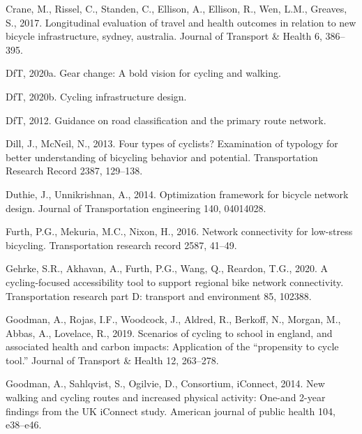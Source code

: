 \documentclass[
]{article}
\newlength{\cslhangindent}
\newlength{\cslentryspacingunit} %
\newenvironment{CSLReferences}[2] %
 {%
  \setlength{\parindent}{0pt}
  \ifodd #1
  \let\oldpar\par
  \def\par{\hangindent=\cslhangindent\oldpar}
  \fi
  \setlength{\parskip}{#2\cslentryspacingunit}
 }%
 {}
\begin{document}
\begin{CSLReferences}{1}{0}
\leavevmode{}%
Crane, M., Rissel, C., Standen, C., Ellison, A., Ellison, R., Wen, L.M., Greaves, S., 2017. Longitudinal evaluation of travel and health outcomes in relation to new bicycle infrastructure, sydney, australia. Journal of Transport \& Health 6, 386--395.

\leavevmode{}%
DfT, 2020a. Gear change: A bold vision for cycling and walking.

\leavevmode{}%
DfT, 2020b. Cycling infrastructure design.

\leavevmode{}%
DfT, 2012. Guidance on road classification and the primary route network.

\leavevmode{}%
Dill, J., McNeil, N., 2013. Four types of cyclists? Examination of typology for better understanding of bicycling behavior and potential. Transportation Research Record 2387, 129--138.

\leavevmode{}%
Duthie, J., Unnikrishnan, A., 2014. Optimization framework for bicycle network design. Journal of Transportation engineering 140, 04014028.

\leavevmode{}%
Furth, P.G., Mekuria, M.C., Nixon, H., 2016. Network connectivity for low-stress bicycling. Transportation research record 2587, 41--49.

\leavevmode{}%
Gehrke, S.R., Akhavan, A., Furth, P.G., Wang, Q., Reardon, T.G., 2020. A cycling-focused accessibility tool to support regional bike network connectivity. Transportation research part D: transport and environment 85, 102388.

\leavevmode{}%
Goodman, A., Rojas, I.F., Woodcock, J., Aldred, R., Berkoff, N., Morgan, M., Abbas, A., Lovelace, R., 2019. Scenarios of cycling to school in england, and associated health and carbon impacts: Application of the {``propensity to cycle tool.''} Journal of Transport \& Health 12, 263--278.

\leavevmode{}%
Goodman, A., Sahlqvist, S., Ogilvie, D., Consortium, iConnect, 2014. New walking and cycling routes and increased physical activity: One-and 2-year findings from the UK iConnect study. American journal of public health 104, e38--e46.


\end{CSLReferences}
\end{document}
